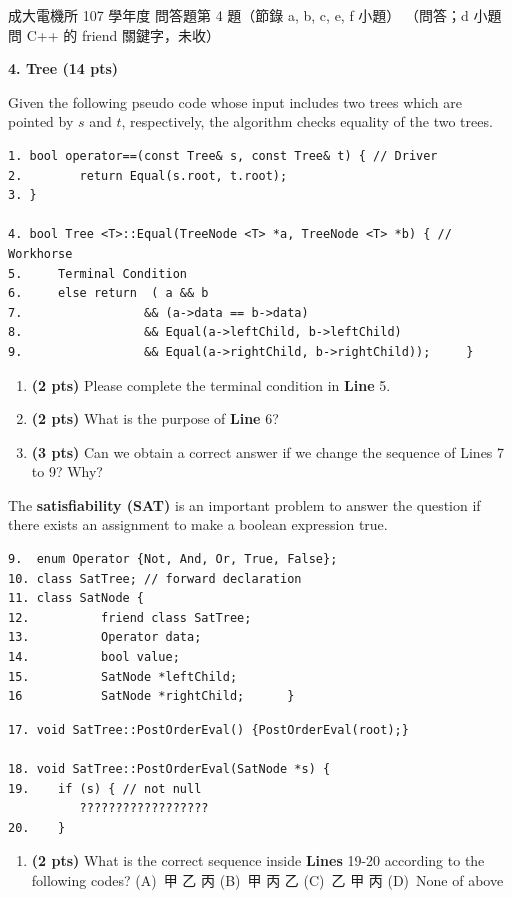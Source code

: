 \begin{pastexam}[label={px:ncku-107-ee-ds-08}]{成大電機所 107 學年度 問答題第 4 題（節錄 a, b, c, e, f 小題）}
（問答；d 小題問 C++ 的 friend 關鍵字，未收）

\textbf{4. Tree (14 pts)}

Given the following pseudo code whose input includes two trees which are pointed by $s$ and $t$,
respectively, the algorithm checks equality of the two trees.
\begin{verbatim}
1. bool operator==(const Tree& s, const Tree& t) { // Driver
2.        return Equal(s.root, t.root);
3. }

4. bool Tree <T>::Equal(TreeNode <T> *a, TreeNode <T> *b) { // Workhorse
5.     Terminal Condition
6.     else return  ( a && b
7.                 && (a->data == b->data)
8.                 && Equal(a->leftChild, b->leftChild)
9.                 && Equal(a->rightChild, b->rightChild));     }
\end{verbatim}
\begin{enumerate}[label=\alph*.]
\item \textbf{(2 pts)} Please complete the terminal condition in \textbf{Line} 5.
\item \textbf{(2 pts)} What is the purpose of \textbf{Line} 6?
\item \textbf{(3 pts)} Can we obtain a correct answer if we change the sequence of Lines 7 to 9? Why?
\end{enumerate}

The \textbf{satisfiability (SAT)} is an important problem to answer the question if there exists an
assignment to make a boolean expression true.
\begin{verbatim}
9.  enum Operator {Not, And, Or, True, False};
10. class SatTree; // forward declaration
11. class SatNode {
12.          friend class SatTree;
13.          Operator data;
14.          bool value;
15.          SatNode *leftChild;
16           SatNode *rightChild;      }
\end{verbatim}
\begin{verbatim}
17. void SatTree::PostOrderEval() {PostOrderEval(root);}

18. void SatTree::PostOrderEval(SatNode *s) {
19.    if (s) { // not null
          ??????????????????
20.    }
\end{verbatim}
\begin{enumerate}[label=\alph*.,start=5]
\item \textbf{(2 pts)} What is the correct sequence inside \textbf{Lines} 19-20 according to the
following codes? (A)~甲 乙 丙 \qquad (B)~甲 丙 乙 \qquad (C)~乙 甲 丙 \qquad (D)~None of above


\end{enumerate}
\end{pastexam}
